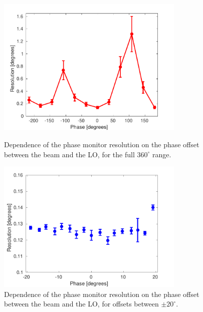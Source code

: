 \begin{figure}
  \centering
  \includegraphics[width=0.8\textwidth]{Figures/phaseMons/resolutionVsShifter}
  \caption{Dependence of the phase monitor resolution on the phase offset between the beam and the LO, for the full \(360^\circ\) range.}
  \label{f:resolutionVsShifter}
  \includegraphics[width=0.8\textwidth]{Figures/phaseMons/resVsSmallPhasOff}
  \caption{Dependence of the phase monitor resolution on the phase offset between the beam and the LO, for offsets between \(\pm20^\circ\).}
  \label{f:resVsSmallPhasOff}
\end{figure}



